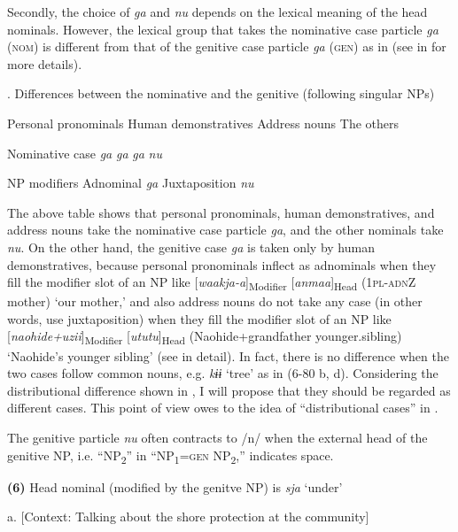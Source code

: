 Secondly, the choice of \textit{ga} and \textit{nu} depends on the lexical meaning of the head nominals. However, the lexical group that takes the nominative case particle \textit{ga} (\textsc{nom}) is different from that of the genitive case particle \textit{ga} (\textsc{gen}) as in  (see  in  for more details).

\begin{styleBeschriftung}
\textmd{. Differences between the nominative and the genitive (following singular NPs)}
\end{styleBeschriftung}

  Personal pronominals  Human demonstratives  Address nouns  The others

Nominative case  \textit{ga}  \textit{ga}  \textit{ga}  \textit{nu}

NP modifiers  Adnominal  \textit{ga}  Juxtaposition  \textit{nu}

The above table shows that personal pronominals, human demonstratives, and address nouns take the nominative case particle \textit{ga}, and the other nominals take \textit{nu}. On the other hand, the genitive case \textit{ga} is taken only by human demonstratives, because personal pronominals inflect as adnominals when they fill the modifier slot of an NP like [\textit{waakja-a}]\textsubscript{Modifier} [\textit{anmaa}]\textsubscript{Head} (1\textsc{pl}-\textsc{adn}Z mother) ‘our mother,’ and also address nouns do not take any case (in other words, use juxtaposition) when they fill the modifier slot of an NP like [\textit{naohide+uzii}]\textsubscript{Modifier} [\textit{ututu}]\textsubscript{Head} (Naohide+grandfather younger.sibling) ‘Naohide’s younger sibling’ (see  in detail). In fact, there is no difference when the two cases follow common nouns, e.g. \textit{kɨɨ} ‘tree’ as in (6-80 b, d). Considering the distributional difference shown in , I will propose that they should be regarded as different cases. This point of view owes to the idea of “distributional cases” in \citet{Comrie1991}.

  The genitive particle \textit{nu} often contracts to /n/ when the external head of the genitive NP, i.e. “NP\textsubscript{2}” in “NP\textsubscript{1}=\textsc{gen} NP\textsubscript{2},” indicates space.

\textbf{(6)}  Head nominal (modified by the genitve NP) is \textit{sja} ‘under’

  a.  [Context: Talking about the shore protection at the community]

